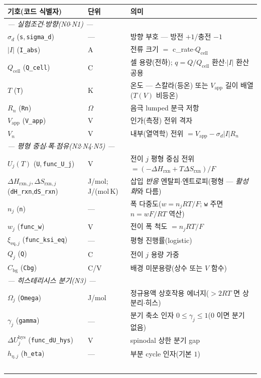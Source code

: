 \documentclass[11pt,a4paper]{article}
\newcommand{\eq}{\mathrm{eq}}
\newcommand{\app}{\mathrm{app}}
\newcommand{\cell}{\mathrm{cell}}
\newcommand{\bg}{\mathrm{bg}}
\newcommand{\rxn}{\mathrm{rxn}}
\newcommand{\hys}{\mathrm{hys}}
\newcommand{\code}[1]{\texttt{#1}}
\begin{document}
\begin{longtable}{p{} p{} p{}}
\toprule 기호(코드 식별자) & 단위 & 의미 \\ \midrule \endhead
\multicolumn{3}{l}{\emph{— 실험조건$\cdot$방향(N0$\cdot$N1) —}}\\
$\sigma_d$ (\code{s},\,\code{sigma\_d}) & --- & 방향 부호 — 방전 $+1$/충전 $-1$ \\
$|I|$ (\code{I\_abs}) & A & 전류 크기 $=$ c\_rate$\cdot Q_\cell$ \\
$Q_\cell$ (\code{Q\_cell}) & C & 셀 용량(전하); $q=Q/Q_\cell$ 환산$\cdot$$|I|$ 환산 공용 \\
$T$ (\code{T}) & K & 온도 — 스칼라(등온) 또는 $V_\app$ 길이 배열($T(V)$ 비등온) \\
$R_n$ (\code{Rn}) & $\Omega$ & 음극 lumped 분극 저항 \\
$V_\app$ (\code{V\_app}) & V & 인가(측정) 전위 격자 \\
$V_n$ & V & 내부(열역학) 전위 $=V_\app-\sigma_d|I|R_n$ \\
\multicolumn{3}{l}{\emph{— 평형 중심$\cdot$폭$\cdot$점유(N2$\cdot$N4$\cdot$N5) —}}\\
$U_j(T)$ (\code{U},\,\code{func\_U\_j}) & V & 전이 $j$ 평형 중심 전위 $=(-\Delta H_\rxn+T\Delta S_\rxn)/F$ \\
$\Delta H_{\rxn,j},\Delta S_{\rxn,j}$ (\code{dH\_rxn},\code{dS\_rxn}) & {\footnotesize J/mol;\,J/(mol\,K)} & 삽입 \emph{반응} 엔탈피$\cdot$엔트로피(평형 — \emph{활성화}와 다름) \\
$n_j$ (\code{n}) & --- & 폭 다중도($w=n_jRT/F$; \code{w} 주면 $n=wF/RT$ 역산) \\
$w_j$ (\code{func\_w}) & V & 전이 폭 척도 $=n_jRT/F$ \\
$\xi_{\eq,j}$ (\code{func\_ksi\_eq}) & --- & 평형 진행률(logistic) \\
$Q_j$ (\code{Q}) & C & 전이 $j$ 용량 가중 \\
$C_\bg$ (\code{Cbg}) & C/V & 배경 미분용량(상수 또는 $V$ 함수) \\
\multicolumn{3}{l}{\emph{— 히스테리시스 분기(N3) —}}\\
$\Omega_j$ (\code{Omega}) & J/mol & 정규용액 상호작용 에너지($>2RT$ 면 상분리$\cdot$히스) \\
$\gamma_j$ (\code{gamma}) & --- & 분기 축소 인자 $0\le\gamma_j\le1$($0$ 이면 분기 없음) \\
$\Delta U_j^\hys$ (\code{func\_dU\_hys}) & V & spinodal 상한 분기 gap \\
$h_{\eta,j}$ (\code{h\_eta}) & --- & 부분 cycle 인자(기본 $1$) \\
$$
\end{longtable}
\end{document}
